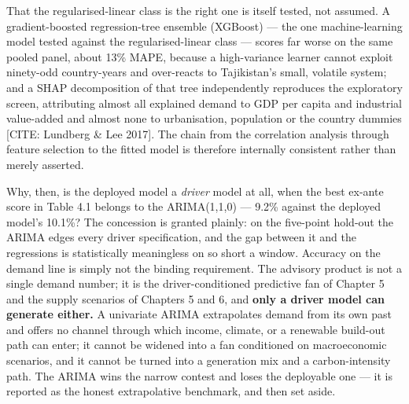 \documentclass[10pt,twocolumn]{article}
\newcommand{\mk}[1]{{\color{amber}\small #1}}
\begin{document}
That the regularised-linear class is the right one is itself tested, not assumed. A gradient-boosted regression-tree ensemble (XGBoost) --- the one machine-learning model tested against the regularised-linear class --- scores far worse on the same pooled panel, about 13\% MAPE, because a high-variance learner cannot exploit ninety-odd country-years and over-reacts to Tajikistan's small, volatile system; and a SHAP decomposition of that tree independently reproduces the exploratory screen, attributing almost all explained demand to GDP per capita and industrial value-added and almost none to urbanisation, population or the country dummies \mk{[CITE: Lundberg \& Lee 2017]}. The chain from the correlation analysis through feature selection to the fitted model is therefore internally consistent rather than merely asserted.

Why, then, is the deployed model a \textit{driver} model at all, when the best ex-ante score in Table 4.1 belongs to the ARIMA(1,1,0) --- 9.2\% against the deployed model's 10.1\%? The concession is granted plainly: on the five-point hold-out the ARIMA edges every driver specification, and the gap between it and the regressions is statistically meaningless on so short a window. Accuracy on the demand line is simply not the binding requirement. The advisory product is not a single demand number; it is the driver-conditioned predictive fan of Chapter 5 and the supply scenarios of Chapters 5 and 6, and \textbf{only a driver model can generate either.} A univariate ARIMA extrapolates demand from its own past and offers no channel through which income, climate, or a renewable build-out path can enter; it cannot be widened into a fan conditioned on macroeconomic scenarios, and it cannot be turned into a generation mix and a carbon-intensity path. The ARIMA wins the narrow contest and loses the deployable one --- it is reported as the honest extrapolative benchmark, and then set aside.
\end{document}
